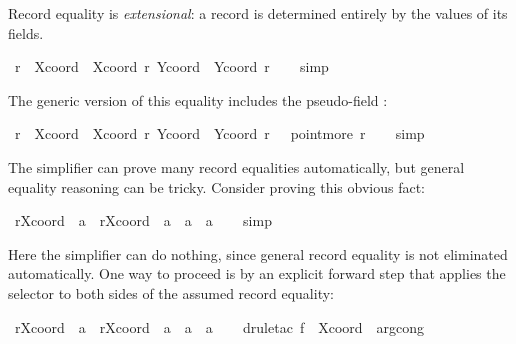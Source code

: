 \begin{isabellebody}
\begin{isamarkuptext}
  \medskip Record equality is \emph{extensional}:
   a record is determined entirely
  by the values of its fields.%
\end{isamarkuptext}%
\isamarkuptrue%
\ {\isachardoublequote}r\ {\isacharequal}\ {\isasymlparr}Xcoord\ {\isacharequal}\ Xcoord\ r{\isacharcomma}\ Ycoord\ {\isacharequal}\ Ycoord\ r{\isasymrparr}{\isachardoublequote}\isanewline
\ \ \isamarkupfalse%
\ simp\isamarkupfalse%
%
\begin{isamarkuptext}%
The generic version of this equality includes the pseudo-field
  :%
\end{isamarkuptext}%
\isamarkuptrue%
\ {\isachardoublequote}r\ {\isacharequal}\ {\isasymlparr}Xcoord\ {\isacharequal}\ Xcoord\ r{\isacharcomma}\ Ycoord\ {\isacharequal}\ Ycoord\ r{\isacharcomma}\ {\isasymdots}\ {\isacharequal}\ point{\isachardot}more\ r{\isasymrparr}{\isachardoublequote}\isanewline
\ \ \isamarkupfalse%
\ simp\isamarkupfalse%
%
\begin{isamarkuptext}%
\medskip The simplifier can prove many record equalities
  automatically, but general equality reasoning can be tricky.
  Consider proving this obvious fact:%
\end{isamarkuptext}%
\isamarkuptrue%
\ {\isachardoublequote}r{\isasymlparr}Xcoord\ {\isacharcolon}{\isacharequal}\ a{\isasymrparr}\ {\isacharequal}\ r{\isasymlparr}Xcoord\ {\isacharcolon}{\isacharequal}\ a{\isacharprime}{\isasymrparr}\ {\isasymLongrightarrow}\ a\ {\isacharequal}\ a{\isacharprime}{\isachardoublequote}\isanewline
\ \ \isamarkupfalse%
\ simp{\isacharquery}\isanewline
\ \ \isamarkupfalse%
\isamarkupfalse%
%
\begin{isamarkuptext}%
Here the simplifier can do nothing, since general record equality is
  not eliminated automatically.  One way to proceed is by an explicit
  forward step that applies the selector  to both sides
  of the assumed record equality:%
\end{isamarkuptext}%
\isamarkuptrue%
\ {\isachardoublequote}r{\isasymlparr}Xcoord\ {\isacharcolon}{\isacharequal}\ a{\isasymrparr}\ {\isacharequal}\ r{\isasymlparr}Xcoord\ {\isacharcolon}{\isacharequal}\ a{\isacharprime}{\isasymrparr}\ {\isasymLongrightarrow}\ a\ {\isacharequal}\ a{\isacharprime}{\isachardoublequote}\isanewline
\ \ \isamarkupfalse%
\ {\isacharparenleft}drule{\isacharunderscore}tac\ f\ {\isacharequal}\ Xcoord\ \ arg{\isacharunderscore}cong{\isacharparenright}\isamarkupfalse%

\end{isabellebody}
